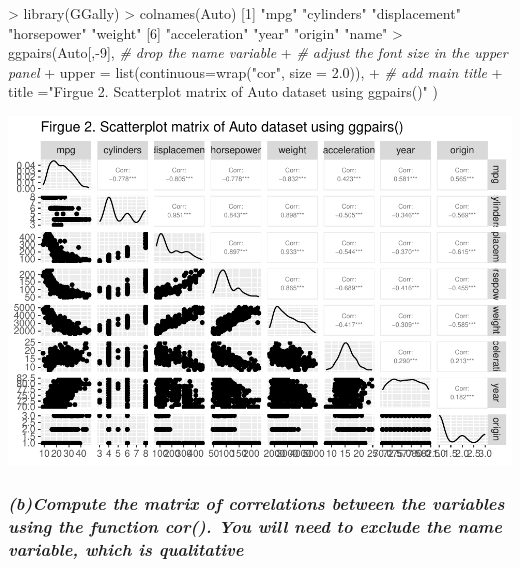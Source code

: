 \documentclass[
]{article}
\newenvironment{Shaded}{\begin{snugshade}}{\end{snugshade}}
\newcommand{\AttributeTok}[1]{\textcolor[rgb]{0.77,0.63,0.00}{#1}}
\newcommand{\CommentTok}[1]{\textcolor[rgb]{0.56,0.35,0.01}{\textit{#1}}}
\newcommand{\DecValTok}[1]{\textcolor[rgb]{0.00,0.00,0.81}{#1}}
\newcommand{\FloatTok}[1]{\textcolor[rgb]{0.00,0.00,0.81}{#1}}
\newcommand{\FunctionTok}[1]{\textcolor[rgb]{0.00,0.00,0.00}{#1}}
\newcommand{\NormalTok}[1]{#1}
\newcommand{\SpecialCharTok}[1]{\textcolor[rgb]{0.00,0.00,0.00}{#1}}
\newcommand{\StringTok}[1]{\textcolor[rgb]{0.31,0.60,0.02}{#1}}
\begin{document}
\begin{Shaded}
\begin{Highlighting}[]
\SpecialCharTok{\textgreater{}} \FunctionTok{library}\NormalTok{(GGally)}
\SpecialCharTok{\textgreater{}} \FunctionTok{colnames}\NormalTok{(Auto)}
\NormalTok{[}\DecValTok{1}\NormalTok{] }\StringTok{"mpg"}          \StringTok{"cylinders"}    \StringTok{"displacement"} \StringTok{"horsepower"}   \StringTok{"weight"}      
\NormalTok{[}\DecValTok{6}\NormalTok{] }\StringTok{"acceleration"} \StringTok{"year"}         \StringTok{"origin"}       \StringTok{"name"}        
\SpecialCharTok{\textgreater{}} \FunctionTok{ggpairs}\NormalTok{(Auto[,}\SpecialCharTok{{-}}\DecValTok{9}\NormalTok{], }\CommentTok{\# drop the name variable}
\SpecialCharTok{+}         \CommentTok{\# adjust the font size in the upper panel}
\SpecialCharTok{+}         \AttributeTok{upper =} \FunctionTok{list}\NormalTok{(}\AttributeTok{continuous=}\FunctionTok{wrap}\NormalTok{(}\StringTok{"cor"}\NormalTok{, }\AttributeTok{size =} \FloatTok{2.0}\NormalTok{)),}
\SpecialCharTok{+}         \CommentTok{\# add main title}
\SpecialCharTok{+}         \AttributeTok{title =}\StringTok{"Firgue 2. Scatterplot matrix of Auto dataset using ggpairs()"}\NormalTok{ )}
\end{Highlighting}
\end{Shaded}

\includegraphics{Homework_09_new_Pan_files/figure-latex/unnamed-chunk-2-1.pdf}

\hypertarget{bcompute-the-matrix-of-correlations-between-the-variables-using-the-function-cor.-you-will-need-to-exclude-the-name-variable-which-is-qualitative}{%
\subsubsection{\texorpdfstring{\emph{(b)Compute the matrix of
correlations between the variables using the function cor(). You will
need to exclude the name variable, which is
qualitative}}{(b)Compute the matrix of correlations between the variables using the function cor(). You will need to exclude the name variable, which is qualitative}}\label{bcompute-the-matrix-of-correlations-between-the-variables-using-the-function-cor.-you-will-need-to-exclude-the-name-variable-which-is-qualitative}}
\end{document}
